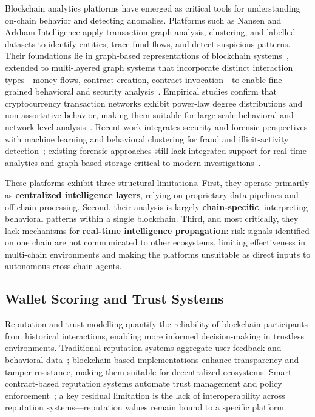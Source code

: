 \documentclass[journal]{IEEEtran}
\begin{document}
Blockchain analytics platforms have emerged as critical tools for
understanding on-chain behavior and detecting anomalies. Platforms
such as Nansen and Arkham Intelligence apply transaction-graph
analysis, clustering, and labelled datasets to identify entities, trace
fund flows, and detect suspicious patterns. Their foundations lie in
graph-based representations of blockchain
systems~\cite{MukhopadhyaySHO16,SerenaFD22}, extended to multi-layered
graph systems that incorporate distinct interaction types---money
flows, contract creation, contract invocation---to enable fine-grained
behavioral and security analysis~\cite{ChenLZCLLLZ20}. Empirical
studies confirm that cryptocurrency transaction networks exhibit
power-law degree distributions and non-assortative behavior, making
them suitable for large-scale behavioral and network-level
analysis~\cite{MotamedB19}. Recent work integrates security and
forensic perspectives with machine learning and behavioral clustering
for fraud and illicit-activity
detection~\cite{MishraP25,FanLZJB20,electronics13173568}; existing
forensic approaches still lack integrated support for real-time
analytics and graph-based storage critical to modern
investigations~\cite{NahaZ24,MasudHSAAAY21}.

These platforms exhibit three structural limitations. First, they
operate primarily as \textbf{centralized intelligence layers}, relying
on proprietary data pipelines and off-chain processing. Second, their
analysis is largely \textbf{chain-specific}, interpreting behavioral
patterns within a single blockchain. Third, and most critically, they
lack mechanisms for \textbf{real-time intelligence propagation}: risk
signals identified on one chain are not communicated to other
ecosystems, limiting effectiveness in multi-chain environments and
making the platforms unsuitable as direct inputs to autonomous
cross-chain agents.

\subsection{Wallet Scoring and Trust Systems}

Reputation and trust modelling quantify the reliability of blockchain
participants from historical interactions, enabling more informed
decision-making in trustless environments. Traditional reputation
systems aggregate user feedback and behavioral data~\cite{HasanBB23};
blockchain-based implementations enhance transparency and
tamper-resistance, making them suitable for decentralized
ecosystems. Smart-contract-based reputation systems automate trust
management and policy enforcement~\cite{AlmasoudHH20}; a key residual
limitation is the lack of interoperability across reputation
systems---reputation values remain bound to a specific platform.
\end{document}

